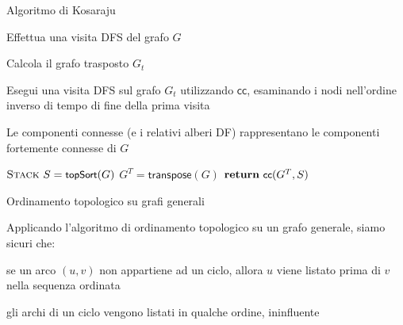 \begin{frame}{Algoritmo di Kosaraju}

\vspace{-6pt}
\begin{myboxtitle}
\BI
\item Effettua una visita DFS del grafo $G$
\item Calcola il grafo trasposto $G_t$
\item Esegui una visita DFS sul grafo $G_t$ utilizzando $\textsf{cc}$, esaminando i nodi nell'ordine inverso di tempo di fine della prima visita
\item Le componenti connesse (e i relativi alberi DF) rappresentano le componenti fortemente connesse di $G$
\EI
\end{myboxtitle}

\begin{Procedure}
\caption[A]{$\INTEGER[\,]$ \scc($\Graph\ G$)}

  $\textsc{Stack}\ S = \textsf{{\small topSort}}(G)$
  $G^T = \textsf{transpose}(G)$
  $\Return\ \connectedcomponents(G^T, S)$

\end{Procedure}
\end{frame}

\begin{frame}{Ordinamento topologico su grafi generali}

\vspace{-6pt}
\begin{myboxtitle}
Applicando l'algoritmo di ordinamento topologico su un grafo generale, siamo
sicuri che:
\BIL
\item se un arco $(u,v)$ non appartiene ad un ciclo, allora $u$ viene listato
prima di $v$ nella sequenza ordinata
\item gli archi di un ciclo vengono listati in qualche ordine, ininfluente
\EIL
\end{myboxtitle}



\end{frame}

